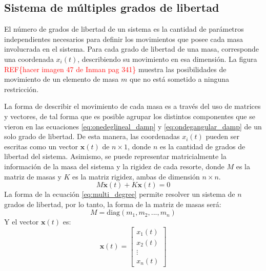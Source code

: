 \subsection{Sistema de múltiples grados de libertad}
El número de grados de libertad de un sistema es la cantidad de parámetros independientes necesarios para definir los movimientos que posee cada masa involucrada en el sistema. Para cada grado de libertad de una masa, corresponde una coordenada $x_i(t)$, describiendo su movimiento en esa dimensión. La figura \textcolor{red}{REF\{hacer imagen 47 de Inman pag 341\}} muestra las posibilidades de movimiento de un elemento de masa $m$ que no está sometido a ninguna restricción.

La forma de describir el movimiento de cada masa es a través del uso de matrices y vectores, de tal forma que es posible agrupar los distintos componentes que se vieron en las ecuaciones \ref{eq:onedeglineal_damp} y \ref{eq:ondegangular_damp} de un solo grado de libertad. De esta manera, las coordenadas $x_i(t)$ pueden ser escritas como un vector $\mathbf{x}(t)$ de $n \times 1$, donde $n$ es la cantidad de grados de libertad del sistema. Asimismo, se puede representar matricialmente la información de la masa del sistema y la rigidez de cada resorte, donde $\mathit{M}$ es la matriz de masas y $\mathit{K}$ es la matriz rigidez, ambas de dimensión $n \times n$. 
\begin{equation}\label{eq:multi_degree}
	\mathit{M}\mathbf{\ddot{x}}(t) + \mathit{K}\mathbf{x}(t) = 0
\end{equation}
La forma de la ecuación \ref{eq:multi_degree} permite resolver un sistema de $n$ grados de libertad, por lo tanto, la forma de la matriz de masas será:
\begin{equation*}
	\mathit{M}=\text{diag}(m_1,m_2,...,m_n)
\end{equation*}
Y el vector $\mathbf{x}(t)$ es:
\begin{equation*}
	\mathbf{x}(t) = \begin{bmatrix}
	x_1(t)\\
	x_2(t)\\
	\vdots\\
	x_n(t)
	\end{bmatrix}
\end{equation*} 

